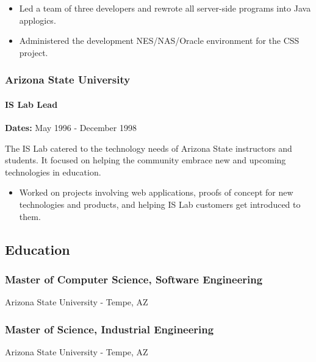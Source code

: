 \documentclass[
]{article}
\providecommand{\tightlist}{%
  \setlength{\itemsep}{0pt}\setlength{\parskip}{0pt}}
\renewcommand{\tightlist}{%
  \setlength{\itemsep}{0.12em}\setlength{\parskip}{0pt}\setlength{\parsep}{0pt}%
}
\begin{document}
\begin{itemize}
\tightlist
\item
  Led a team of three developers and rewrote all server-side programs
  into Java applogics.
\item
  Administered the development NES/NAS/Oracle environment for the CSS
  project.
\end{itemize}

\subsubsection{Arizona State University}\label{arizona-state-university}

\paragraph{IS Lab Lead}\label{is-lab-lead}

\textbf{Dates:} May 1996 - December 1998

The IS Lab catered to the technology needs of Arizona State instructors
and students. It focused on helping the community embrace new and
upcoming technologies in education.

\begin{itemize}
\tightlist
\item
  Worked on projects involving web applications, proofs of concept for
  new technologies and products, and helping IS Lab customers get
  introduced to them.
\end{itemize}

\subsection{Education}\label{education}

\subsubsection{Master of Computer Science, Software
Engineering}\label{master-of-computer-science-software-engineering}

Arizona State University - Tempe, AZ

\subsubsection{Master of Science, Industrial
Engineering}\label{master-of-science-industrial-engineering}

Arizona State University - Tempe, AZ
\end{document}
